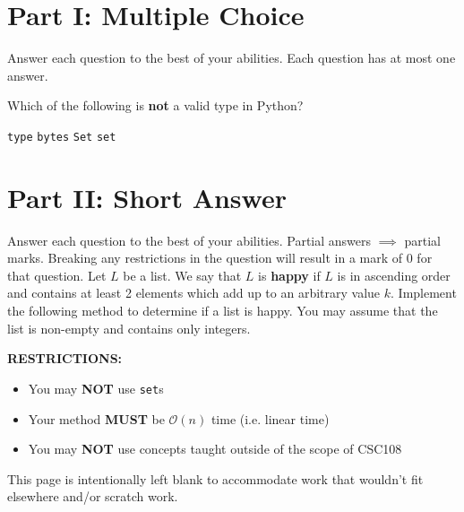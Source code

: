 \documentclass[letterpaper,12pt,addpoints]{exam}
\begin{document}
\section*{Part I: Multiple Choice}
Answer each question to the best of your abilities. Each question has at most one answer.
\begin{questions}


\question[2] Which of the following is \textbf{not} a valid type in Python?
    \begin{choices}
        \choice \texttt{type}
        \choice \texttt{bytes}
        \choice \texttt{Set}
        \choice \texttt{set}
    \end{choices}



\clearpage
\section*{Part II: Short Answer}
Answer each question to the best of your abilities. Partial answers $\implies$ partial marks. Breaking any restrictions in the question will result in a mark of 0 for that question.
\question[10] 
Let $L$ be a list. We say that $L$ is \textbf{happy} if $L$ is in ascending order and contains at least 2 elements which add up to an arbitrary value $k$. Implement the following method to determine if a list is happy. You may assume that the list is non-empty and contains only integers.

\begin{center}
    
    \textbf{RESTRICTIONS:}
    \begin{itemize}
        \item You may \textbf{NOT} use \texttt{set}s
        \item Your method \textbf{MUST} be $\mathcal{O}(n)$ time (i.e. linear time)
        \item You may \textbf{NOT} use concepts taught outside of the scope of CSC108
    \end{itemize}
\end{center}

\end{questions}

\clearpage
This page is intentionally left blank to accommodate work that wouldn't fit elsewhere and/or scratch work.
\end{document}
